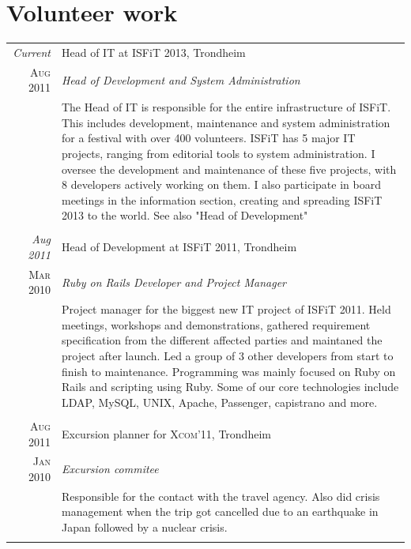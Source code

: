 \documentclass[a4paper,10pt]{article}
\begin{document}
\section{Volunteer work}
\begin{tabular}{r|p{12cm}}
  \emph{Current} & Head of IT at ISFiT 2013, Trondheim  \\\textsc{Aug 2011}&\emph{Head of Development and System Administration}\\&\footnotesize{The Head of IT is responsible for the entire infrastructure of ISFiT. This includes development, maintenance and system administration for a festival with over 400 volunteers. ISFiT has 5 major IT projects, ranging from editorial tools to system administration. I oversee the development and maintenance of these five projects, with 8 developers actively working on them. I also participate in board meetings in the information section, creating and spreading ISFiT 2013 to the world. See also "Head of Development"}\\\multicolumn{2}{c}{} \\
  \emph{Aug 2011} & Head of Development at ISFiT 2011, Trondheim  \\\textsc{Mar 2010}&\emph{Ruby on Rails Developer and Project Manager}\\&\footnotesize{Project manager for the biggest new IT project of ISFiT 2011. Held meetings, workshops and demonstrations, gathered requirement specification from the different affected parties and maintaned the project after launch. Led a group of 3 other developers from start to finish to maintenance. Programming was mainly focused on Ruby on Rails and scripting using Ruby. Some of our core technologies include LDAP, MySQL, UNIX, Apache, Passenger, capistrano and more.}\\\multicolumn{2}{c}{} \\
  \textsc{Aug 2011}& Excursion planner for \textsc{Xcom'11}, Trondheim \\\textsc{Jan 2010}& \emph{Excursion commitee}\\&\footnotesize{Responsible for the contact with the travel agency. Also did crisis management when the trip got cancelled due to an earthquake in Japan followed by a nuclear crisis.}\\\multicolumn{2}{c}{} \\
\end{tabular}
\end{document}
